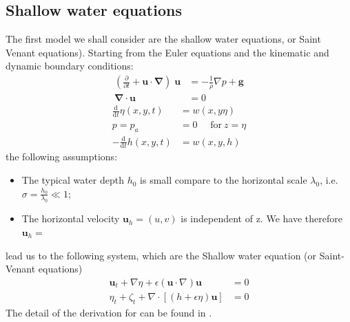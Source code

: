 \documentclass[11pt,a4paper]{article}
\begin{document}
		\subsection{Shallow water equations}
			The first model we shall consider are the shallow water equations, or Saint Venant equations). Starting from 
the Euler equations and the kinematic and dynamic boundary conditions:
			\begin{align}
				\displaystyle (\frac{\partial}{\partial t} + \mathbf{u} \cdot \mathbf{\nabla}) \; \mathbf{u} & = \displaystyle -\frac{1}{\rho}\nabla p + \mathbf{g} \\
				\mathbf{\nabla} \cdot \mathbf{u} & = 0 
			\end{align}
			\begin{align}
				\frac{\mathrm{d}}{\mathrm{d} t} \eta(x,y,t) & = w(x,y \eta) \\
				p  = p_a & = 0 \: \: \:  \: \: \: \mathrm{for} \: z=\eta \\ 
				-\frac{\mathrm{d}}{\mathrm{d}t} h(x,y,t) & = w(x,y,h)
			\end{align}
			the following assumptions:
			\begin{itemize}
				\item The typical water depth $h_0$ is small compare to the horizontal scale $\lambda_0$, i.e. $\sigma = \frac{h_0}{\lambda_0} \ll 1 $;
				\item The horizontal velocity $\mathbf{u}_h = (u,v)$ is independent of z. We have therefore $\mathbf{u}_h =$
			\end{itemize}			
			 lead us to the following system, which are the Shallow water equation (or Saint-Venant equations)
			\begin{align}
				\mathbf{u}_t + \nabla\eta + \epsilon (\mathbf{u} \cdot \nabla) \mathbf{u} &= 0 \label{SWE1}\\
				\eta_t + \zeta_t + \nabla \cdot [(h+\epsilon \eta) \mathbf{u}] &= 0 \label{SWE2}
			\end{align}						
			The detail of the derivation for can be found in \cite{JMC2013}.
			\pagebreak
			
\end{document}
